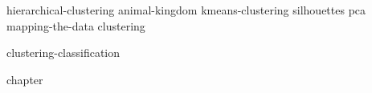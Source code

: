 \documentclass[symmetric, justified, a4paper]{tufte-book}
\begin{document}

{hierarchical-clustering}
{animal-kingdom}
{kmeans-clustering}
{silhouettes}
{pca}
{mapping-the-data}
{clustering}

{clustering-classification}













{chapter}


\backmatter
\nocite{*}





\end{document}
